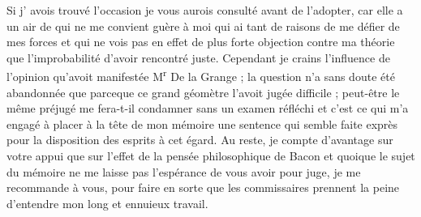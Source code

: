 \documentclass[11pt,a4paper]{article}
\begin{document}
Si  j' avois trouvé l'occasion je vous aurois consulté avant de l'adopter, car elle a un air de  qui ne me convient guère à moi qui ai tant de raisons de me défier de mes forces et qui ne vois pas en effet de plus forte objection contre ma théorie que l'improbabilité d'avoir rencontré juste. Cependant je crains l'influence de l'opinion qu'avoit manifestée M\textsuperscript{r} De la Grange ; la question n'a sans doute été abandonnée que parceque ce grand géomètre l'avoit jugée difficile ; peut-être le même préjugé me fera-t-il condamner sans un examen réfléchi et c'est ce qui m'a engagé à placer à la tête de mon mémoire une sentence qui semble faite exprès pour la disposition des esprits à cet égard. Au reste, je compte d'avantage sur votre appui que sur l'effet de la pensée philosophique de Bacon et quoique le sujet du mémoire ne me laisse pas l'espérance de vous avoir pour juge, je me recommande à vous, pour faire en sorte que les commissaires prennent la peine d'entendre mon long et ennuieux travail.

\end{document}
